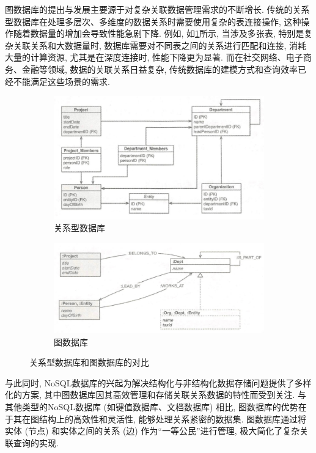图数据库的提出与发展主要源于对复杂关联数据管理需求的不断增长. 传统的关系型数据库在处理多层次、多维度的数据关系时需要使用复杂的表连接操作, 这种操作随着数据量的增加会导致性能急剧下降. 例如, 如\cref{fig:relational}所示, 当涉及多张表, 特别是复杂关联关系和大数据量时, 数据库需要对不同表之间的关系进行匹配和连接, 消耗大量的计算资源, 尤其是在深度连接时, 性能下降更为显著. 而在社交网络、电子商务、金融等领域, 数据的关联关系日益复杂, 传统数据库的建模方式和查询效率已经不能满足这些场景的需求.
\begin{figure}[!t]
	\centering
	\begin{subfigure}[b]{1\textwidth} \includegraphics[width=\textwidth]{images/14.png}
    \caption{关系型数据库}
    \label{fig:relational}
	\end{subfigure}

	\begin{subfigure}[b]{1\textwidth} \includegraphics[width=\textwidth]{images/15.png}
    \caption{图数据库}
    \label{fig:graph_db}
	\end{subfigure}
	\caption{关系型数据库和图数据库的对比}
	\label{fig:relational_vs_graph}
\end{figure}


与此同时, NoSQL数据库的兴起为解决结构化与非结构化数据存储问题提供了多样化的方案, 其中图数据库因其高效管理和存储关联关系数据的特性而受到关注. 与其他类型的NoSQL数据库 (如键值数据库、文档数据库) 相比, 图数据库的优势在于其在图结构上的高效性和灵活性, 能够处理关系紧密的数据集. 图数据库通过将实体 (节点) 和实体之间的关系 (边) 作为“一等公民”进行管理, 极大简化了复杂关联查询的实现.

